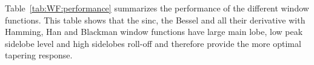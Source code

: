 \documentclass[useAMS,usenatbib]{mn2e}
\begin{document}
Table~\ref{tab:WF:performance} summarizes the performance of the different window functions. 
This table shows that the sinc, the Bessel and all their derivative with Hamming, Han and Blackman window functions 
have large main lobe,  low peak sidelobe level and high sidelobes roll-off and therefore provide the more optimal tapering response.





\end{document}
